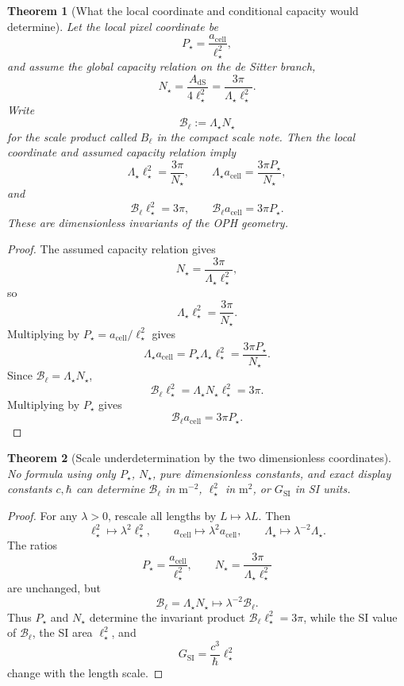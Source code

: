 \documentclass[11pt]{article}
\newtheorem{theorem}{Theorem}[section]
\begin{document}
\begin{theorem}[What the local coordinate and conditional capacity would determine]\label{thm:pn-dimensionless-geometry}
Let the local pixel coordinate be
\[
P_\star=\frac{a_{\mathrm{cell}}}{\ell_\star^2},
\]
and assume the global capacity relation on the de Sitter branch,
\[
N_\star=\frac{A_{\mathrm{dS}}}{4\ell_\star^2}
=\frac{3\pi}{\Lambda_\star\ell_\star^2}.
\]
Write
\[
\mathcal B_\ell:=\Lambda_\star N_\star
\]
for the scale product called \(B_\ell\) in the compact scale note. Then the local coordinate and
assumed capacity relation imply
\[
\Lambda_\star\ell_\star^2=\frac{3\pi}{N_\star},
\qquad
\Lambda_\star a_{\mathrm{cell}}=\frac{3\pi P_\star}{N_\star},
\]
and
\[
\mathcal B_\ell\ell_\star^2=3\pi,
\qquad
\mathcal B_\ell a_{\mathrm{cell}}=3\pi P_\star.
\]
These are dimensionless invariants of the OPH geometry.
\end{theorem}

\begin{proof}
The assumed capacity relation gives
\[
N_\star=\frac{3\pi}{\Lambda_\star\ell_\star^2},
\]
so
\[
\Lambda_\star\ell_\star^2=\frac{3\pi}{N_\star}.
\]
Multiplying by \(P_\star=a_{\mathrm{cell}}/\ell_\star^2\) gives
\[
\Lambda_\star a_{\mathrm{cell}}
=P_\star\Lambda_\star\ell_\star^2
=\frac{3\pi P_\star}{N_\star}.
\]
Since \(\mathcal B_\ell=\Lambda_\star N_\star\),
\[
\mathcal B_\ell\ell_\star^2
=\Lambda_\star N_\star\ell_\star^2
=3\pi.
\]
Multiplying by \(P_\star\) gives
\[
\mathcal B_\ell a_{\mathrm{cell}}=3\pi P_\star.
\]
\end{proof}

\begin{theorem}[Scale underdetermination by the two dimensionless coordinates]\label{thm:pn-scale-underdetermination}
No formula using only \(P_\star\), \(N_\star\), pure dimensionless constants, and exact display
constants \(c,\hbar\) can determine \(\mathcal B_\ell\) in \(\mathrm{m^{-2}}\),
\(\ell_\star^2\) in \(\mathrm{m^2}\), or \(G_{\mathrm{SI}}\) in SI units.
\end{theorem}

\begin{proof}
For any \(\lambda>0\), rescale all lengths by \(L\mapsto\lambda L\). Then
\[
\ell_\star^2\mapsto\lambda^2\ell_\star^2,\qquad
a_{\mathrm{cell}}\mapsto\lambda^2a_{\mathrm{cell}},\qquad
\Lambda_\star\mapsto\lambda^{-2}\Lambda_\star.
\]
The ratios
\[
P_\star=\frac{a_{\mathrm{cell}}}{\ell_\star^2},
\qquad
N_\star=\frac{3\pi}{\Lambda_\star\ell_\star^2}
\]
are unchanged, but
\[
\mathcal B_\ell=\Lambda_\star N_\star
\mapsto
\lambda^{-2}\mathcal B_\ell.
\]
Thus \(P_\star\) and \(N_\star\) determine the invariant product
\(\mathcal B_\ell\ell_\star^2=3\pi\), while the SI value of \(\mathcal B_\ell\), the SI area
\(\ell_\star^2\), and
\[
G_{\mathrm{SI}}=\frac{c^3}{\hbar}\ell_\star^2
\]
change with the length scale.
\end{proof}
\end{document}
